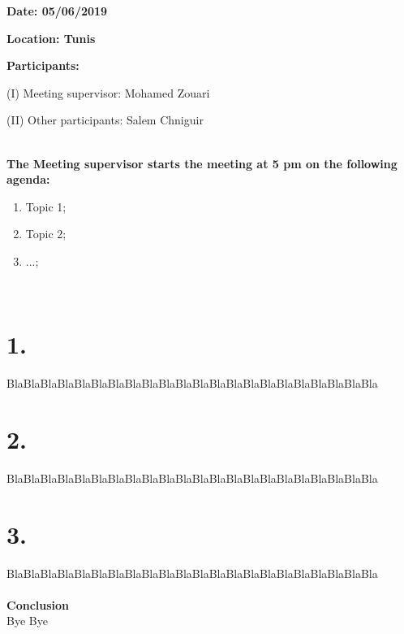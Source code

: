 \documentclass[a4paper, 11pt]{article}
\def \Date { 05/06/2019 }%
\def \Location { Tunis }%
\def \Supervisor { Mohamed Zouari }%
\def \Others { Salem Chniguir }%
\def \Time { 5 pm }%
\begin{document}
\pagestyle{style1}

\textbf{Date: \Date} 

\textbf{Location: \Location}  

\textbf{Participants:} 
\begin{description}
\item (I) Meeting supervisor: \Supervisor
\item (II) Other participants: \Others
\end{description}

\makebox[\linewidth]{\rule{\linewidth}{0.4pt}}\\
\textbf{The Meeting supervisor starts the meeting at \Time on the following agenda:} 
\begin{enumerate}
\item Topic 1;
\item Topic 2;
\item ...;

\end{enumerate}
\makebox[\linewidth]{\rule{\linewidth}{0.4pt}}\\

\section*{1.}
BlaBlaBlaBlaBlaBlaBlaBlaBlaBlaBlaBlaBlaBlaBlaBlaBlaBlaBlaBlaBlaBla
\section*{2. }
BlaBlaBlaBlaBlaBlaBlaBlaBlaBlaBlaBlaBlaBlaBlaBlaBlaBlaBlaBlaBlaBla

\section*{3.}
BlaBlaBlaBlaBlaBlaBlaBlaBlaBlaBlaBlaBlaBlaBlaBlaBlaBlaBlaBlaBlaBla
\\
\\
 \textbf{Conclusion}
 \\
Bye Bye
\end{document}
